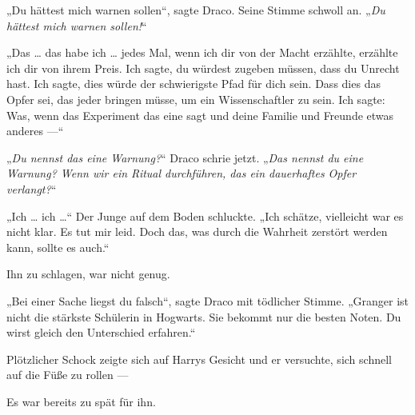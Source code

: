 „Du hättest mich warnen sollen“, sagte Draco. Seine Stimme schwoll an.
„\emph{Du hättest mich warnen sollen!}“

„Das … das habe ich … jedes Mal, wenn ich dir von der Macht erzählte, erzählte ich dir von ihrem Preis. Ich sagte, du würdest zugeben müssen, dass du Unrecht hast. Ich sagte, dies würde der schwierigste Pfad für dich sein. Dass dies das Opfer sei, das jeder bringen müsse, um ein Wissenschaftler zu sein. Ich sagte: Was, wenn das Experiment das eine sagt und deine Familie und Freunde etwas anderes —“

„\emph{Du nennst das eine Warnung?}“ Draco schrie jetzt.
„\emph{Das nennst du eine Warnung? Wenn wir ein Ritual durchführen, das ein dauerhaftes Opfer verlangt?}“

„Ich … ich …“ Der Junge auf dem Boden schluckte.
„Ich schätze, vielleicht war es nicht klar. Es tut mir leid. Doch das, was durch die Wahrheit zerstört werden kann, sollte es auch.“

Ihn zu schlagen, war nicht genug.

„Bei einer Sache liegst du falsch“, sagte Draco mit tödlicher Stimme.
„Granger ist nicht die stärkste Schülerin in Hogwarts. Sie bekommt nur die besten Noten. Du wirst gleich den Unterschied erfahren.“

Plötzlicher Schock zeigte sich auf Harrys Gesicht und er versuchte, sich schnell auf die Füße zu rollen —

Es war bereits zu spät für ihn.


